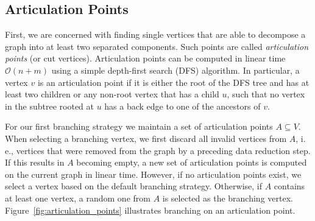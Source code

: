 \documentclass[a4paper,UKenglish,cleveref, autoref, thm-restate]{lipics-v2021}
\newcommand{\ie}{i.\,e.,\xspace}
\begin{document}
\subsection{Articulation Points}
First, we are concerned with finding single vertices that are able to decompose a graph into at least two separated components.
Such points are called \emph{articulation points} (or cut vertices).
Articulation points can be computed in linear time $\mathcal{O}(n+m)$ using a simple depth-first search (DFS) algorithm.
In particular, a vertex $v$ is an articulation point if it is either the root of
the DFS tree and has at least two children or any non-root vertex that has a child $u$, such that no vertex in
the subtree rooted at $u$ has a back edge to one of the ancestors of
$v$.

For our first branching strategy we maintain a set of articulation points $A \subseteq V$.
When selecting a branching vertex, we first discard all invalid vertices from
$A$, \ie vertices that were removed from the graph by a preceding data reduction step.
If this results in $A$ becoming empty, a new set of articulation points is computed on the current graph in linear time.
However, if no articulation points exist, we select a vertex based on the default branching strategy.
Otherwise, if $A$ contains at least one vertex, a random one from $A$ is selected as the branching
vertex. Figure~\ref{fig:articulation_points} illustrates branching on an
articulation point.
\end{document}

